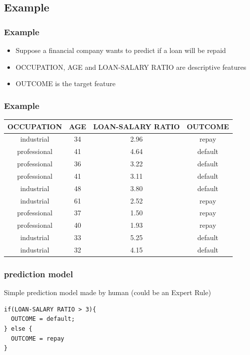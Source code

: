 \documentclass{beamer}
\begin{document}
\subsection{Example}
\begin{frame}
  \frametitle{Example\footnotemark}
  \begin{itemize}
	\item<+-> Suppose a financial company wants to predict if a loan will be repaid
	\item<+-> OCCUPATION, AGE and LOAN-SALARY RATIO are descriptive features
	\item<+-> OUTCOME is the target feature	
   \end{itemize}
\end{frame}

\begin{frame}
  \frametitle{Example}
\begin{center}
 \begin{tabular}{c c c c} 
 \hline
 OCCUPATION & AGE & LOAN-SALARY RATIO & OUTCOME \\ [0.5ex] 
 \hline
industrial & 34 & 2.96 & repay \\
professional & 41 & 4.64 & default \\
professional & 36 & 3.22 & default \\
professional & 41 & 3.11 & default \\
industrial & 48 & 3.80 & default \\
industrial & 61 & 2.52 & repay \\
professional & 37 & 1.50 & repay \\
professional & 40 & 1.93 & repay \\
industrial & 33 & 5.25 & default \\
industrial & 32 & 4.15 & default \\
\end{tabular}
\end{center}
\end{frame}

\begin{frame}[containsverbatim]
	\frametitle{prediction model}
	Simple prediction model made by human (could be an Expert Rule) \\
	\begin{lstlisting}
if(LOAN-SALARY RATIO > 3){
  OUTCOME = default;
} else {
  OUTCOME = repay
}
	\end{lstlisting}
\end{frame}
\end{document}
